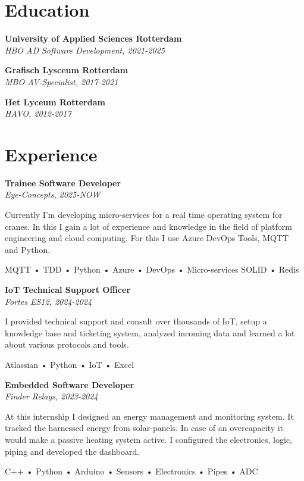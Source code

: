 \documentclass[11pt, twoside, a4paper, titlepage]{article}
\begin{document}
\begin{tcolorbox}[boxsep=0mm, left=0mm, right=0mm, top=0mm, bottom=0mm, height=23cm]
\begin{minipage}[t]{14cm}
\begin{tcolorbox}[grow to left by=0.0cm, colframe=white, colback=white, height=22.9cm]
			\section*{Education}
			\textbf{University of Applied Sciences Rotterdam}\\
			\emph{HBO AD Software Development, 2021-2025}
			
			\vspace*{0.3cm}
			
			\textbf{Grafisch Lysceum Rotterdam}\\
			\emph{MBO AV-Specialist, 2017-2021}
			
			\vspace*{0.3cm}
			
			\textbf{Het Lyceum Rotterdam}\\
			\emph{HAVO, 2012-2017}
			
			\section*{Experience}
			\textbf{Trainee Software Developer}\\
			\emph{Eye-Concepts, 2025-NOW}\\
			\parbox{13cm}{Currently I'm developing micro-services for a real time operating system for cranes. In this I gain a lot of experience and knowledge in the field of platform engineering and cloud computing. For this I use Azure DevOps Tools, MQTT and Python.}
			\parbox{13cm}{ MQTT • TDD • Python • Azure • DevOps • Micro-services SOLID • Redis }
			
			\vspace*{0.3cm}
			
			\textbf{IoT Technical Support Officer}\\
			\emph{Fortes ES12, 2024-2024}\\
			\parbox{13cm}{I provided technical support and consult over thousands of IoT, setup a knowledge base and ticketing system, analyzed incoming data and learned a lot about various protocols and tools.}
			\parbox{13cm}{ Atlassian • Python • IoT • Excel }
			
			\vspace*{0.3cm}
			
			\textbf{Embedded Software Developer}\\
			\emph{Finder Relays, 2023-2024}\\
			\parbox{13cm}{At this internship I designed an energy management and monitoring system. It tracked the harnessed energy from solar-panels. In case of an overcapacity it would make a passive heating system active. I configured the electronics, logic, piping and developed the dashboard.}
			\parbox{13cm}{ C++ • Python • Arduino • Sensors • Electronics • Pipes • ADC }
			

\end{tcolorbox}
\end{minipage}
\end{tcolorbox}
\end{document}

